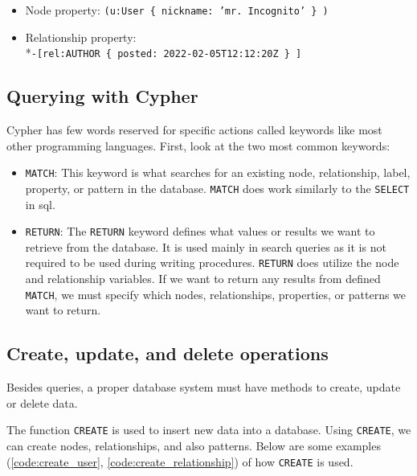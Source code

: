 \begin{itemize}
	\item {Node property: \texttt{(u:User \{ nickname: 'mr. Incognito' \} )}}
	\item {Relationship property: \\*\texttt{-[rel:AUTHOR \{ posted: 2022-02-05T12:12:20Z \} ]}}
\end{itemize}

\subsection{Querying with Cypher}

Cypher has few words reserved for specific actions called keywords like most other programming languages. \cite{neo4j_querying_nodate}
First, look at the two most common keywords:
\begin{itemize}
	\item {\texttt{MATCH}: This keyword is what searches for an existing node, relationship, label, property, or pattern in the database.
	      \texttt{MATCH} does work similarly to the \texttt{SELECT} in \acrshort{sql}.}
	\item {\texttt{RETURN}: The \texttt{RETURN} keyword defines what values or results we want to retrieve from the database.
	      It is used mainly in search queries as it is not required to be used during writing procedures.
	      \texttt{RETURN} does utilize the node and relationship variables. If we want to return any results from defined \texttt{MATCH},
	      we must specify which nodes, relationships, properties, or patterns we want to return.}
\end{itemize}

\subsection{Create, update, and delete operations}

Besides queries, a proper database system must have methods to create, update or delete data.

The function \texttt{CREATE} is used to insert new data into a database.
Using \texttt{CREATE}, we can create nodes, relationships, and also patterns.
Below are some examples (\ref{code:create_user}, \ref{code:create_relationship}) of how \texttt{CREATE} is used. \cite{neo4j_updating_nodate}


